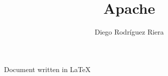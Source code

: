 \documentclass[a4paper,10pt]{article}
\title{Apache}
\author{Diego Rodríguez Riera}
\begin{document}
\maketitle
\pagebreak
\tableofcontents
\pagebreak



\raggedleft Document written in \LaTeX{}
\end{document}
